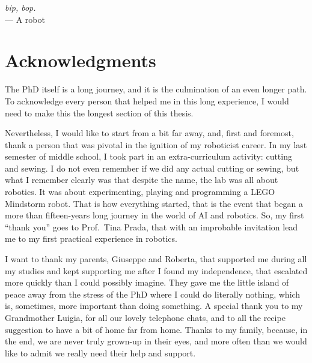 
\begin{flushright}{\slshape bip, bop.} \\ \medskip
    --- A robot
\end{flushright}



\bigskip

\begingroup
\let\clearpage\relax
\let\cleardoublepage\relax
\let\cleardoublepage\relax
\chapter*{Acknowledgments}
The PhD itself is a long journey, and it is the culmination of an even longer path. To acknowledge every person that helped me in this long experience, I would need to make this the longest section of this thesis.

Nevertheless, I would like to start from a bit far away, and, first and foremost, thank a person that was pivotal in the ignition of my roboticist career. In my last semester of middle school, I took part in an extra-curriculum activity: cutting and sewing. I do not even remember if we did any actual cutting or sewing, but what I remember clearly was that despite the name, the lab was all about robotics. It was about experimenting, playing and programming a LEGO Mindstorm robot. That is how everything started, that is the event that began a more than fifteen-years long journey in the world of AI and robotics. So, my first ``thank you'' goes to Prof.~Tina Prada, that with an improbable invitation lead me to my first practical experience in robotics.

I want to thank my parents, Giuseppe and Roberta, that supported me during all my studies and kept supporting me after I found my independence, that escalated more quickly than I could possibly imagine. They gave me the little island of peace away from the stress of the PhD where I could do literally nothing, which is, sometimes, more important than doing something. A special thank you to my Grandmother Luigia, for all our lovely telephone chats, and to all the recipe suggestion to have a bit of home far from home. Thanks to my family, because, in the end, we are never truly grown-up in their eyes, and more often than we would like to admit we really need their help and support.

